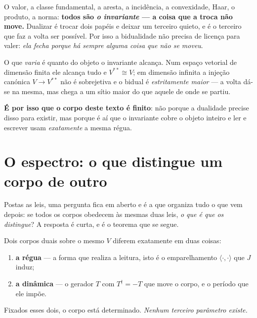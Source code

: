 \documentclass[livro.tex]{subfiles}
\begin{document}

\begin{obs}
O valor, a classe fundamental, a aresta, a incidência, a convexidade, Haar, o produto, a norma:
\textbf{todos são \emph{o invariante} --- a coisa que a troca não move.} Dualizar é trocar dois
papéis e deixar um terceiro quieto, e é o terceiro que faz a volta ser possível. Por isso a
bidualidade não precisa de licença para valer: \emph{ela fecha porque há sempre alguma coisa que não
se moveu}.

\smallskip
\noindent O que \emph{varia} é quanto do objeto o invariante alcança. Num espaço vetorial de dimensão
finita ele alcança tudo e $V^{**}\cong V$; em dimensão infinita a injeção canónica $V\to V^{**}$ não é
sobrejetiva e o bidual é \emph{estritamente maior} --- a volta dá-se na mesma, mas chega a um sítio
maior do que aquele de onde se partiu.

\smallskip
\noindent \textbf{É por isso que o corpo deste texto é finito}: não porque a dualidade precise disso
para existir, mas porque é aí que o invariante cobre o objeto inteiro e ler e escrever usam
\emph{exatamente} a mesma régua.
\end{obs}

\section{O espectro: o que distingue um corpo de outro}\label{sec:espectro}

\noindent Postas as leis, uma pergunta fica em aberto e é a que organiza tudo o que vem depois:
se todos os corpos obedecem às mesmas duas leis, \emph{o que é que os distingue}? A resposta é
curta, e é o teorema que se segue.

\begin{teorema}\label{thm:espectro}
Dois corpos duais sobre o mesmo $V$ diferem exatamente em duas coisas:
\begin{enumerate}\itemsep1pt
\item \textbf{a régua} --- a forma que realiza a leitura, isto é o emparelhamento
$\langle\cdot,\cdot\rangle$ que $J$ induz;
\item \textbf{a dinâmica} --- o gerador $T$ com $T^{\dagger}=-T$ que move o corpo, e o período
que ele impõe.
\end{enumerate}
Fixados esses dois, o corpo está determinado. \emph{Nenhum terceiro parâmetro existe.}
\end{teorema}
\end{document}
